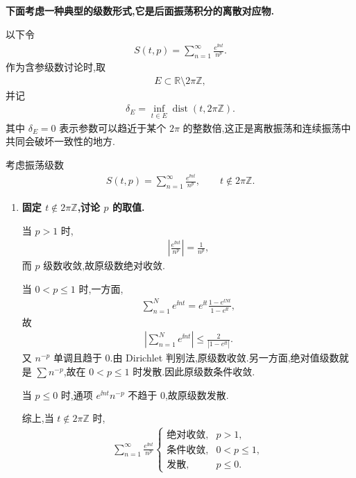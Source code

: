 \textbf{下面考虑一种典型的级数形式,它是后面振荡积分的离散对应物.}

以下令
\begin{align*}
	S(t,p)=\sum_{n=1}^{\infty}\frac{e^{\ii nt}}{n^p}.
\end{align*}
作为含参级数讨论时,取
\begin{align*}
	E\subset\mathbb R\setminus2\pi\mathbb Z,
\end{align*}
并记
\begin{align*}
	\delta_E=\inf_{t\in E}\operatorname{dist}(t,2\pi\mathbb Z).
\end{align*}
其中 $\delta_E=0$ 表示参数可以趋近于某个 $2\pi$ 的整数倍,这正是离散振荡和连续振荡中共同会破坏一致性的地方.

\begin{exbox}
	考虑振荡级数
	\begin{align*}
		S(t,p)=\sum_{n=1}^{\infty}\frac{e^{\ii nt}}{n^p},
		\qquad t\notin2\pi\mathbb Z.
	\end{align*}

	\begin{enumerate}
		\item \textbf{固定 $t\notin2\pi\mathbb Z$,讨论 $p$ 的取值.}

		当 $p>1$ 时,
		\begin{align*}
			\left|\frac{e^{\ii nt}}{n^p}\right|=\frac1{n^p},
		\end{align*}
		而 $p$ 级数收敛,故原级数绝对收敛.

		当 $0<p\leq1$ 时,一方面,
		\begin{align*}
			\sum_{n=1}^N e^{\ii nt}
			=
			e^{\ii t}\frac{1-e^{\ii Nt}}{1-e^{\ii t}},
		\end{align*}
		故
		\begin{align*}
			\left|\sum_{n=1}^N e^{\ii nt}\right|
			\leq \frac{2}{|1-e^{\ii t}|}.
		\end{align*}
		又 $n^{-p}$ 单调且趋于 $0$.由 Dirichlet 判别法,原级数收敛.另一方面,绝对值级数就是 $\sum n^{-p}$,故在 $0<p\leq1$ 时发散.因此原级数条件收敛.

		当 $p\leq0$ 时,通项 $e^{\ii nt}n^{-p}$ 不趋于 $0$,故原级数发散.

		综上,当 $t\notin2\pi\mathbb Z$ 时,
		\begin{gather*}
			\sum_{n=1}^{\infty}\frac{e^{\ii nt}}{n^p}
			\begin{cases}
				\text{绝对收敛},&p>1,\\[3pt]
				\text{条件收敛},&0<p\leq1,\\[3pt]
				\text{发散},&p\leq0.
			\end{cases}
		\end{gather*}


\end{enumerate}
\end{exbox}

